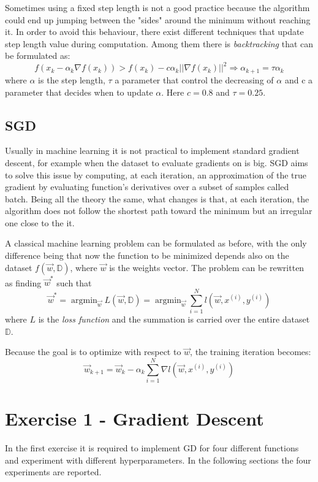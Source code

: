 \documentclass[a4paper,10pt]{report}
\newcommand{\argmin}{\mathop{\mathrm{argmin}}}
\begin{document}
Sometimes using a fixed step length is not a good practice because the algorithm could end up jumping between the "sides" around the minimum without reaching it.
In order to avoid this behaviour, there exist different techniques that update step length value during computation. Among them there is \emph{backtracking} that can be formulated as:
\begin{equation}
  f(x_k - \alpha_k \nabla f(x_k)) > f(x_k) - c  \alpha_k ||\nabla f(x_k)||^2 \Rightarrow \alpha_{k+1} = \tau \alpha_k
\end{equation}
where $\alpha$ is the step length, $\tau$ a parameter that control the decreasing of $\alpha$ and c a parameter that decides when to update $\alpha$.
Here $c=0.8$ and $\tau=0.25$.
\newpage
\section{SGD}
Usually in machine learning it is not practical to implement standard gradient descent, for example when the dataset to evaluate gradients on is big.
SGD aims to solve this issue by computing, at each iteration, an approximation of the true gradient by evaluating function's derivatives over a subset of samples called batch.
Being all the theory the same, what changes is that, at each iteration, the algorithm does not follow the shortest path toward the minimum but an irregular one close to the it.

A classical machine learning problem can be formulated as before, with the only difference being that now the function to be minimized depends also on the dataset $f(\vec{w},\mathbb{D})$, where $\vec{w}$ is the weights vector.
The problem can be rewritten as finding $\vec{w}^*$ such that
\begin{equation}
  \vec{w}^* = \argmin_{\vec{w}} L(\vec{w},\mathbb{D}) = \argmin_{\vec{w}} \sum_{i=1}^{N} l(\vec{w},x^{(i)},y^{(i)})
\end{equation}
where $L$ is the \emph{loss function} and the summation is carried over the entire dataset $\mathbb{D}$.

Because the goal is to optimize with respect to $\vec{w}$, the training iteration becomes:
\begin{equation}
  \vec{w}_{k+1} = \vec{w}_k - \alpha_k \sum_{i=1}^N \nabla l(\vec{w},x^{(i)},y^{(i)})
\end{equation}


\chapter{Exercise 1 - Gradient Descent}\label{chap:gd}
In the first exercise it is required to implement GD for four different functions and experiment with different hyperparameters. In the following sections the four experiments are reported.
\end{document}
